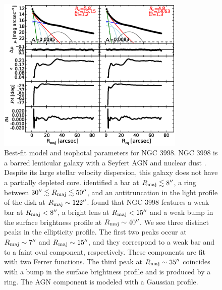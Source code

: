 \documentclass[preprint2]{emulateapj}
\newcommand{\fitfigurewidth}{0.8\textwidth}
\begin{document}
  \begin{figure}[h]
  \begin{center}
  \includegraphics[width=\fitfigurewidth]{images/n3998_1Dfit.eps}
  \caption{Best-fit model and isophotal parameters for NGC 3998.
  NGC 3998 is a barred lenticular galaxy with a Seyfert AGN and nuclear dust \citep{knapp1996n3998}.
  Despite its large stellar velocity dispersion, this galaxy does not have a partially depleted core. 
  \cite{gutierrez2011} identified a bar at $R_{\rm maj} \lesssim 8''$, a ring between $30'' \lesssim R_{\rm maj} \lesssim 50''$, and  
  an antitruncation in the light profile of the disk at $R_{\rm maj} \sim 122''$.
  \cite{laurikainen2010} found that NGC 3998 features a weak bar at $R_{\rm maj} < 8''$,
  a bright lens at $R_{\rm maj} < 15''$ and a weak bump in the surface brightness profile at $R_{\rm maj} \sim 40''$.
  We see three distinct peaks in the ellipticity profile.
  The first two peaks occur at $R_{\rm maj} \sim 7''$ and $R_{\rm maj} \sim 15''$, and they correspond to a weak bar and to a faint 
  oval component, respectively.
  These components are fit with two Ferrer functions.
  The third peak at $R_{\rm maj} \sim 35''$ coincides with a bump in the surface brightness profile and is produced by a ring.
  The AGN component is modeled with a Gaussian profile.
  }
  \end{center}
  \end{figure}
\end{document}
